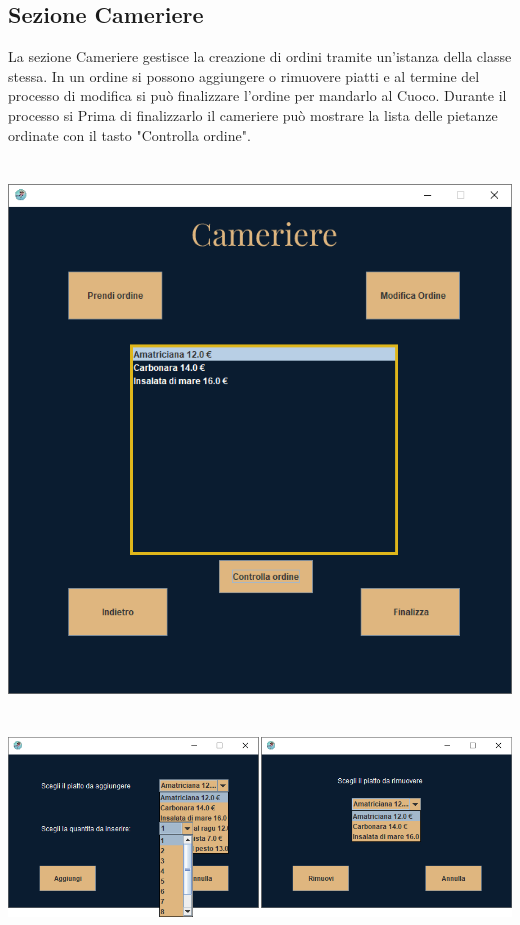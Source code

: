 \documentclass{article}
\begin{document}
    \subsection{Sezione Cameriere}
    La sezione Cameriere gestisce la creazione di ordini tramite un'istanza della classe stessa. In un ordine si possono aggiungere o rimuovere piatti e al termine del processo di modifica si può finalizzare l'ordine per mandarlo al Cuoco. Durante il processo si
    Prima di finalizzarlo il cameriere può mostrare la lista delle pietanze ordinate con il tasto "Controlla ordine".
    \\\\\\
    \includegraphics[width=\textwidth]{Cameriere.png}
    \\\\\\
    \includegraphics[width=\textwidth]{MetodiCameriere.png}
    
\end{document}
